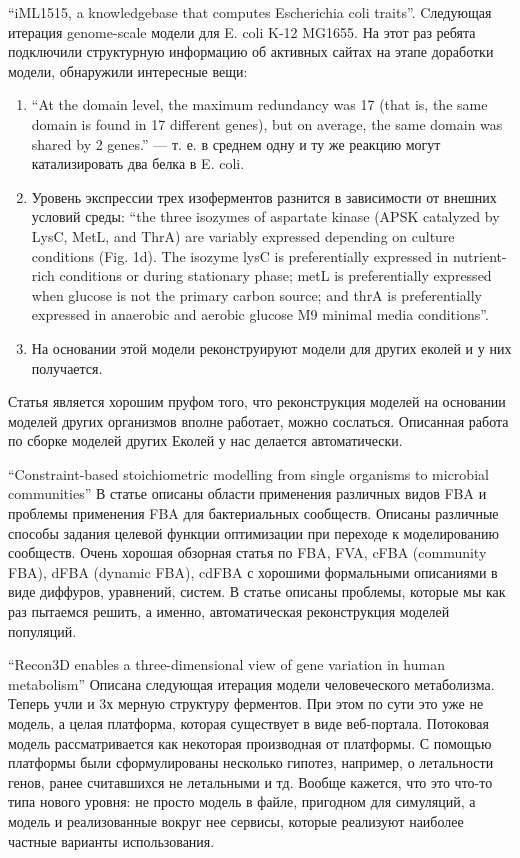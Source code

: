 “iML1515, a knowledgebase that computes Escherichia coli traits”. Cледующая итерация genome-scale модели для E. coli K-12 MG1655. На этот раз ребята подключили структурную информацию об активных сайтах на этапе доработки модели, обнаружили интересные вещи: 
\begin{enumerate}
  \item “At the domain level, the maximum redundancy was 17 (that is, the same domain is found in 17 different genes), but on average, the same domain was shared by 2 genes.” — т. е. в среднем одну и ту же реакцию могут катализировать два белка в E. coli.
  \item Уровень экспрессии трех изоферментов разнится в зависимости от внешних условий среды: “the three isozymes of aspartate kinase (APSK catalyzed by LysC, MetL, and ThrA) are variably expressed depending on culture conditions (Fig. 1d). The isozyme lysC is preferentially expressed in nutrient-rich conditions or during stationary phase; metL is preferentially expressed when glucose is not the primary carbon source; and thrA is preferentially expressed in anaerobic and aerobic glucose M9 minimal media conditions”.
  \item На основании этой модели реконструируют модели для других еколей и у них получается.
\end{enumerate}
Статья является хорошим пруфом того, что реконструкция моделей на основании моделей других организмов вполне работает, можно сослаться. Описанная работа по сборке моделей других Еколей у нас делается автоматически.

“Constraint-based stoichiometric modelling from single organisms to microbial communities”
В статье описаны области применения различных видов FBA и проблемы применения FBA для бактериальных сообществ. Описаны различные способы задания целевой функции оптимизации при переходе к моделированию сообществ.
Очень хорошая обзорная статья по FBA, FVA, cFBA (community FBA), dFBA (dynamic FBA), cdFBA с хорошими формальными описаниями в виде диффуров, уравнений, систем.
В статье описаны проблемы, которые мы как раз пытаемся решить, а именно, автоматическая реконструкция моделей популяций.

“Recon3D enables a three-dimensional view of gene variation in human metabolism”
Описана следующая итерация модели человеческого метаболизма. Теперь учли и 3х мерную структуру ферментов. При этом по сути это уже не модель, а целая платформа, которая существует в виде веб-портала. Потоковая модель рассматривается как некоторая производная от платформы. С помощью платформы были сформулированы несколько гипотез, например, о летальности генов, ранее считавшихся не летальными и тд. Вообще кажется, что это что-то типа нового уровня: не просто модель в файле, пригодном для симуляций, а модель и реализованные вокруг нее сервисы, которые реализуют наиболее частные варианты использования.

